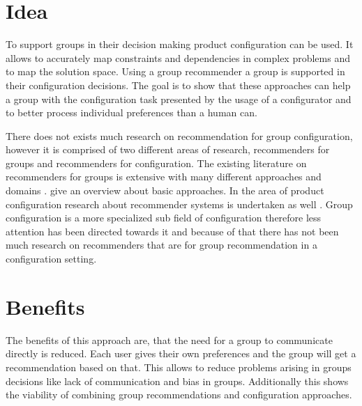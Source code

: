 \section{Idea}
\label{sec:Introduction:Idea}

To support groups in their decision making product configuration can be used. It allows to accurately map constraints and dependencies in complex problems and to map the solution space. Using a group recommender a group is supported in their configuration decisions. The goal is to show that these approaches can help a group with the configuration task presented by the usage of a configurator and to better process individual preferences than a human can.


There does not exists much research on recommendation for group configuration, however it is comprised of two different areas of research, recommenders for groups and recommenders for configuration.
The existing literature on recommenders for groups is extensive with many different approaches and domains \cite{delicResearchMethodsGroup2016, chenInterfaceInteractionDesign2011, atasItemRecommendationUsing2017, jamesonRecommendationGroups2007, chenEmpatheticonsDesigningEmotion2014, liuCGSPAComprehensiveGroup2019}. \citeauthor{felfernigGroupRecommenderSystems2018} \cite{felfernigGroupRecommenderSystems2018} give an overview about basic approaches.
In the area of product configuration research about recommender systems is undertaken as well \cite{pereiraFeatureBasedPersonalizedRecommender2016, scholzConfigurationbasedRecommenderSystem2017, scholzEffectsDecisionSpace2017}.
Group configuration is a more specialized sub field of configuration therefore less attention has been directed towards it and because of that there has not been much research on recommenders that are for group recommendation in a configuration setting.

\section{Benefits}
\label{sec:Introduction:Benefits}

The benefits of this approach are, that the need for a group to communicate directly is reduced. Each user gives their own preferences and the group will get a recommendation based on that. This allows to reduce problems arising in groups decisions like lack of communication and bias in groups. Additionally this shows the viability of combining group recommendations and configuration approaches.

